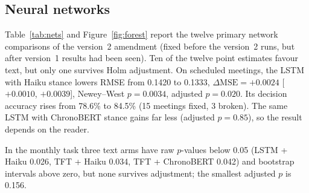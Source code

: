 \documentclass[11pt]{article}
\newcommand{\dmse}{\Delta\mathrm{MSE}}
\begin{document}
\subsection{Neural networks}

Table~\ref{tab:nets} and Figure~\ref{fig:forest} report the twelve primary network comparisons of the version~2
amendment (fixed before the version~2 runs, but after version~1 results had been seen). Ten of the twelve point
estimates favour text, but only one survives Holm adjustment. On scheduled meetings, the LSTM with
Haiku stance lowers RMSE from 0.1420 to 0.1333, $\dmse=+0.0024$ [$+0.0010$, $+0.0039$], Newey--West $p=0.0034$,
adjusted $p=0.020$. Its decision accuracy rises from 78.6\% to 84.5\% (15 meetings fixed, 3 broken). The same LSTM
with ChronoBERT stance gains far less (adjusted $p=0.85$), so the result depends on the reader.

In the monthly task three text arms have raw $p$-values below 0.05 (LSTM + Haiku 0.026, TFT + Haiku 0.034, TFT +
ChronoBERT 0.042) and bootstrap intervals above zero, but none survives adjustment; the smallest adjusted $p$ is
0.156.
\end{document}
